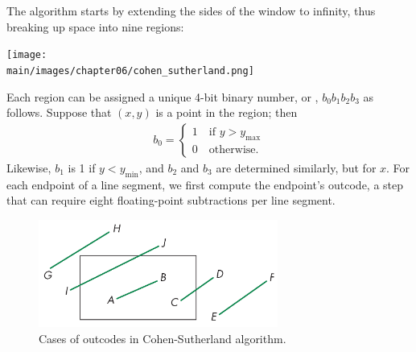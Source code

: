 \documentclass[../COS3712_Notes.tex]{subfiles}
\begin{document}
        The algorithm starts by extending the sides of the window to infinity,
        thus breaking up space into nine regions:
        \begin{center}
          \texttt{[image: \\main/images/chapter06/cohen\_sutherland.png]}
        \end{center}
        Each region can be assigned a unique 4-bit binary number, or , $b_0 b_1 b_2 b_3$
        as follows.
        Suppose that $(x, y)$ is a point in the region; then
        \begin{align*}
          b_0 = \begin{cases}
            1 \quad \text{if } y > y_{\text{max}}\\
            0 \quad \text{otherwise.}
          \end{cases}
        \end{align*}
        Likewise, $b_1$ is 1 if $y < y_{\text{min}}$, and $b_2$ and $b_3$ are determined similarly,
        but for $x$.
        For each endpoint of a line segment, we first compute the endpoint's outcode,
        a step that can require eight floating-point subtractions per line segment.

        \begin{figure}[b]
          \begin{center}
            \includegraphics[width=0.7\textwidth]{images/chapter06/outcode_cases.png}
          \end{center}
          \caption{Cases of outcodes in Cohen-Sutherland algorithm.}
          \label{fig:cases}
        \end{figure}
\end{document}
